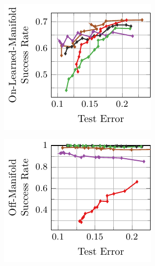 \begin{appendix}
\begin{figure}[t]
\begin{subfigure}{0.235\textwidth}
        \includegraphics[width=\textwidth]{appendix_l2_fashion_error_on_learned_cw.pdf}
    \end{subfigure}
    \begin{subfigure}{0.235\textwidth}
        \centering
        \includegraphics[width=\textwidth]{appendix_l2_fashion_error_off_cw.pdf}
    \end{subfigure}
    \\
\end{figure}
\end{appendix}
